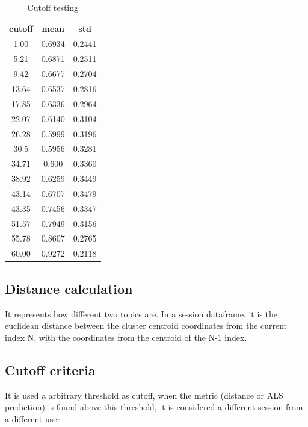\documentclass[ecp,tc,english]{iiufrgs}
\begin{document}
        \begin{table}[!ht]
            \centering
            \begin{tabular}{ |c|c|c| } 
                \hline
                cutoff & mean & std \\
                \hline 
                1.00 & 0.6934 & 0.2441 \\ 
                5.21 & 0.6871 & 0.2511 \\ 
                9.42 & 0.6677 & 0.2704 \\ 
                13.64 & 0.6537 & 0.2816 \\ 
                17.85 & 0.6336 & 0.2964 \\ 
                22.07 & 0.6140 & 0.3104 \\ 
                26.28 & 0.5999 & 0.3196 \\ 
                30.5 & 0.5956 & 0.3281 \\ 
                34.71 & 0.600 & 0.3360 \\ 
                38.92 & 0.6259 & 0.3449 \\ 
                43.14 & 0.6707 & 0.3479 \\ 
                43.35 & 0.7456 & 0.3347 \\ 
                51.57 & 0.7949 & 0.3156 \\ 
                55.78 & 0.8607 & 0.2765 \\ 
                60.00 & 0.9272 & 0.2118 \\ 
                \hline
            \end{tabular}
            \caption{Cutoff testing}
            \label{tab:my_label}
        \end{table}
        
        \subsection{Distance calculation}
        
        It represents how different two topics are.
        In a session dataframe, it is the euclidean distance between the cluster centroid coordinates from the current index N, with the coordinates from the centroid of the N-1 index. 
        
        \subsection{Cutoff criteria}
    
        It is used a arbitrary threshold as cutoff, when the metric (distance or ALS prediction) is found above this threshold, it is considered a different session from a different user   
        
\end{document}

